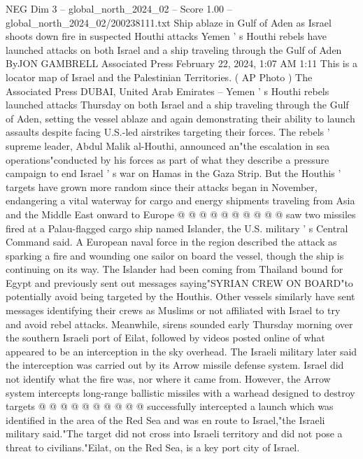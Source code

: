 \begin{textsample}{NEG Dim 3 – global\_north\_2024\_02 – Score 1.00 – global\_north\_2024\_02/200238111.txt}  \label{ex:f3_neg_210}
Ship ablaze in Gulf of Aden as Israel shoots down fire in suspected Houthi attacks Yemen ' s Houthi rebels have launched attacks on both Israel and a ship traveling through the Gulf of Aden ByJON GAMBRELL Associated Press February 22, 2024, 1:07 AM 1:11 This is a locator map of Israel and the Palestinian Territories. ( AP Photo ) The Associated Press DUBAI, United Arab Emirates -- Yemen ' s Houthi rebels launched attacks Thursday on both Israel and a ship traveling through the Gulf of Aden, setting the vessel ablaze and again demonstrating their ability to launch assaults despite facing U.S.-led airstrikes targeting their forces.
The rebels ' supreme leader, Abdul Malik al-Houthi, announced an"the escalation in sea operations"conducted by his forces as part of what they describe a pressure campaign to end Israel ' s war on Hamas in the Gaza Strip.
But the Houthis ' targets have grown more random since their attacks began in November, endangering a vital waterway for cargo and energy shipments traveling from Asia and the Middle East onward to Europe @ @ @ @ @ @ @ @ @ @ saw two missiles fired at a Palau-flagged cargo ship named Islander, the U.S. military ' s Central Command said.
A European naval force in the region described the attack as sparking a fire and wounding one sailor on board the vessel, though the ship is continuing on its way.
The Islander had been coming from Thailand bound for Egypt and previously sent out messages saying"SYRIAN CREW ON BOARD"to potentially avoid being targeted by the Houthis.
Other vessels similarly have sent messages identifying their crews as Muslims or not affiliated with Israel to try and avoid rebel attacks.
Meanwhile, sirens sounded early Thursday morning over the southern Israeli port of Eilat, followed by videos posted online of what appeared to be an interception in the sky overhead.
The Israeli military later said the interception was carried out by its Arrow missile defense system.
Israel did not identify what the fire was, nor where it came from.
However, the Arrow system intercepts long-range ballistic missiles with a warhead designed to destroy targets @ @ @ @ @ @ @ @ @ @ successfully intercepted a launch which was identified in the area of the Red Sea and was en route to Israel,"the Israeli military said."The target did not cross into Israeli territory and did not pose a threat to civilians."Eilat, on the Red Sea, is a key port city of Israel.

\end{textsample}
